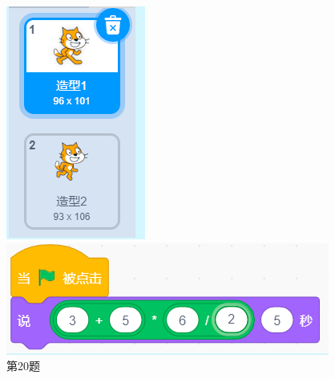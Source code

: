 \documentclass[10pt, a4paper]{article}
\begin{document}
\begin{enumerate}
\begin{figure}[htbp]
\begin{minipage}[t]{.09\textwidth}
                \includegraphics[width=\textwidth]{20.png}
                \caption*{第20题}
            \end{minipage}
            \begin{minipage}[t]{.2\textwidth}
                \centering
                \includegraphics[width=\textwidth]{22.png}

\end{minipage}
\end{figure}
\end{enumerate}
\end{document}
